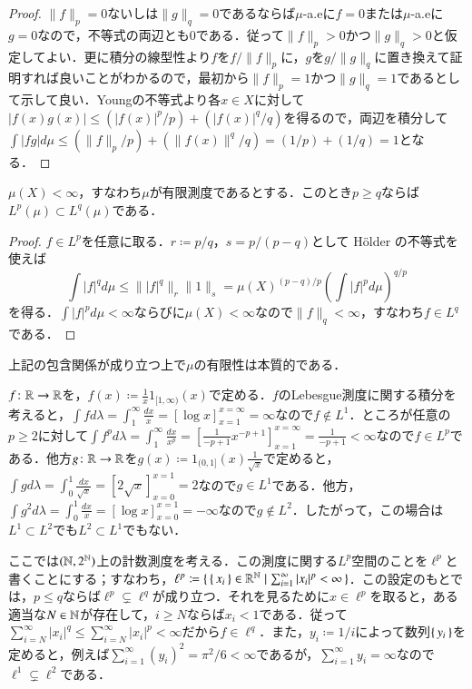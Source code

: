 \begin{proof}
$\|f\|_p =0$ないしは$\|g\|_q =0$であるならば$\mu$-a.eに$f=0$または$\mu$-a.eに$g=0$なので，不等式の両辺とも0である．従って$\|f\|_p > 0$かつ$\|g\|_q > 0$と仮定してよい．更に積分の線型性より$f$を$f/\|f\|_p$に，$g$を$g/\|g\|_q$に置き換えて証明すれば良いことがわかるので，最初から$\|f\|_p=1$かつ$\|g\|_q=1$であるとして示して良い．Youngの不等式より各$x \in X$に対して$|f(x)g(x)| \leq (|f(x)|^p/p) + (|f(x)|^q/q)$を得るので，両辺を積分して$\int |fg| d\mu \leq (\|f\|_p/p) + (\|f(x)\|^q/q) = (1/p) + (1/q) = 1$となる．
\end{proof}

\begin{prop}
$\mu(X) < \infty$，すなわち$\mu$が有限測度であるとする．このとき$p \geq q$ならば$L^p(\mu) \subset L^q(\mu)$である．
\end{prop}

\begin{proof}
$f \in L^p$を任意に取る．$r\coloneqq  p/q$，$s = p/(p-q)$として H\"older の不等式を使えば
\begin{equation}
\int |f|^q d \mu \leq \||f|^q\|_r \|1\|_s =\mu(X)^{(p-q)/p}\left(\int |f|^p d\mu \right)^{q/p}
\end{equation}を得る．$\int |f|^p d\mu < \infty$ならびに$\mu(X) < \infty$なので$\|f\|_q < \infty$，すなわち$f \in L^q$である．
\end{proof}

上記の包含関係が成り立つ上で$\mu$の有限性は本質的である．

\begin{exm}
$f \colon \mathbb{R} \to \mathbb{R}$を，$f(x) \coloneqq \frac{1}{x}1_{[1,\infty)}(x)$で定める．$f$のLebesgue測度に関する積分を考えると，$\int f d\lambda = \int_1^\infty \frac{dx}{x} = \left[ \log x \right]_{x=1}^{x=\infty} = \infty$なので$f \notin L^1$．ところが任意の$p \geq 2$に対して$\int f^p d \lambda = \int_1^\infty \frac{dx}{x^p} = \left[ \frac{1}{-p+1}x^{-p+1} \right]_{x=1}^{x=\infty} = \frac{1}{-p+1} < \infty$なので$f \in L^p$である．他方$g \colon \mathbb{R} \to \mathbb{R}$を$g(x) \coloneqq 1_{(0,1]}(x) \frac{1}{\sqrt{x}}$で定めると，$\int g d\lambda = \int_0^1 \frac{dx}{\sqrt{x}} = \left[ 2 \sqrt{x} \right]_{x=0}^{x=1} = 2$なので$g \in L^1$である．他方，$\int g^2 d \lambda = \int_0^1 \frac{dx}{x} = \left[ \log x \right]_{x=0}^{x=1} = -\infty$なので$g \notin L^2$．したがって，この場合は$L^1 \subset L^2$でも$L^2 \subset L^1$でもない．
\end{exm}

\begin{exm}
ここでは$(\mathbb{N}, 2^{\mathbb{N}})$上の計数測度を考える．この測度に関する$L^p$空間のことを$\ell^p$と書くことにする；すなわち，$\ell^p \coloneqq \set{ \set{x_i} \in \mathbb{R}^{\mathbb{N}}| \sum_{i=1}^\infty |x_i|^p < \infty }$．この設定のもとでは，$p \leq q$ならば$\ell^p \subsetneq \ell^q$が成り立つ．それを見るために$x \in \ell^p$を取ると，ある適当な$N \in \mathbb{N}$が存在して，$i \geq N$ならば$x_i < 1$である．従って$\sum_{i=N}^\infty |x_i|^q \leq \sum_{i=N}^\infty |x_i|^p < \infty$だから$f \in \ell^q$．また，$y_i \coloneqq 1/i$によって数列$\set{y_i}$を定めると，例えば$\sum_{i=1}^\infty (y_i)^2 = \pi^2/6 < \infty$であるが，$\sum_{i=1}^\infty y_i = \infty$なので$\ell^1 \subsetneq \ell^2$である．
\end{exm}

